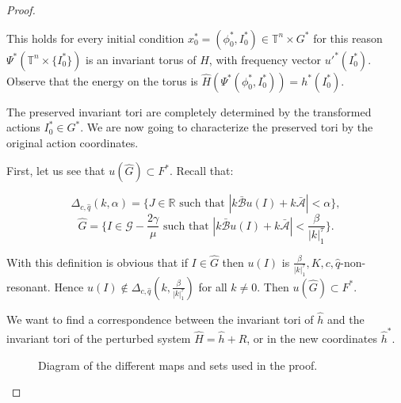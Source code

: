 \begin{proof}
\begin{enumerate}
This holds for every initial condition $x_0^*=(\phi_0^* , I_0^* ) \in \mathbb{T}^n \times G^* $ for this reason $\Psi^* (\mathbb{T}^n\times\{I_0^*\})$ is an invariant torus of $\hat H$, with frequency vector $u'^*(I_0^* )$. Observe that the energy on the torus is $\hat H(\Psi^* (\phi_0^* , I_0^* )) = h^* (I_0^* )$.

The preserved invariant tori are completely determined by the transformed actions $I_0^* \in G^* $. We are now going to characterize the preserved tori by the original action coordinates.

First, let us see that $u(\hat G) \subset F^* $. Recall that:

$$\Delta_{c,\hat q}(k,\alpha) = \{J \in \mathbb{R} \text{ such that } |k\bar{\mathcal{B}}u(I) + k\bar{\mathcal{A}}| < \alpha \},$$
$$\hat G = \{I \in \mathcal{G} - \frac{2\gamma}{\mu} \text{ such that } |k\bar{\mathcal{B}}u(I) + k\bar{\mathcal{A}}|< \frac{\beta}{|k|_1^\tau} \}.$$

With this definition is obvious that if $I\in \hat G$ then $u(I)$ is $\frac{\beta}{|k|_1^\tau},K,c,\hat q$-non-resonant. Hence $u(I) \notin \Delta_{c,\hat q}(k,\frac{\beta}{|k|^\tau_1})$ for all $k \neq 0$. Then $u(\hat G) \subset F^* $.

We want to find a correspondence between the invariant tori of $\hat h$ and the invariant tori of the perturbed system $\hat H = \hat h + R$, or in the new coordinates $\hat h^*$.

\begin{figure}
\centering
{}
\caption{Diagram of the different maps and sets used in the proof.}
\label{fig:diagram_kam}
\end{figure}



\end{enumerate}
\end{proof}

